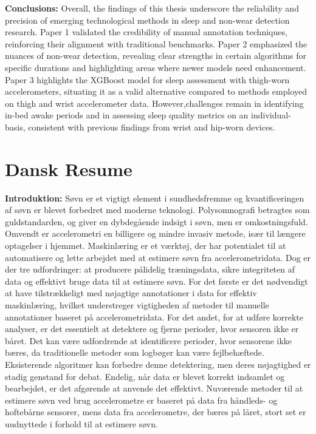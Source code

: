 \documentclass[
  10pt,
]{scrbook}
\let\originaltextbf\textbf
\renewcommand{\textbf}[1]{\textcolor{color1}{\originaltextbf{#1}}}
\begin{document}
\textbf{Conclusions:} Overall, the findings of this thesis underscore
the reliability and precision of emerging technological methods in sleep
and non-wear detection research. Paper 1 validated the credibility of
manual annotation techniques, reinforcing their alignment with
traditional benchmarks. Paper 2 emphasized the nuances of non-wear
detection, revealing clear strengths in certain algorithms for specific
durations and highlighting areas where newer models need enhancement.
Paper 3 highlights the XGBoost model for sleep assessment with
thigh-worn accelerometers, situating it as a valid alternative compared
to methods employed on thigh and wrist accelerometer data.
However,challenges remain in identifying in-bed awake periods and in
assessing sleep quality metrics on an individual-basis, consistent with
previous findings from wrist and hip-worn devices.

\hypertarget{dansk-resume}{%
\chapter{Dansk Resume}\label{dansk-resume}}

\textbf{Introduktion:} Søvn er et vigtigt element i sundhedsfremme og
kvantificeringen af søvn er blevet forbedret med moderne teknologi.
Polysomnografi betragtes som guldstandarden, og giver en dybdegående
indsigt i søvn, men er omkostningsfuld. Omvendt er accelerometri en
billigere og mindre invasiv metode, især til længere optagelser i
hjemmet. Maskinlæring er et værktøj, der har potentialet til at
automatisere og lette arbejdet med at estimere søvn fra
accelerometridata. Dog er der tre udfordringer: at producere pålidelig
træningsdata, sikre integriteten af data og effektivt bruge data til at
estimere søvn. For det første er det nødvendigt at have tilstrækkeligt
med nøjagtige annotationer i data for effektiv maskinlæring, hvilket
understreger vigtigheden af metoder til manuelle annotationer baseret på
accelerometridata. For det andet, for at udføre korrekte analyser, er
det essentielt at detektere og fjerne perioder, hvor sensoren ikke er
båret. Det kan være udfordrende at identificere perioder, hvor sensorene
ikke bæres, da traditionelle metoder som logbøger kan være
fejlbehæftede. Eksisterende algoritmer kan forbedre denne detektering,
men deres nøjagtighed er stadig genstand for debat. Endelig, når data er
blevet korrekt indsamlet og bearbejdet, er det afgørende at anvende det
effektivt. Nuværende metoder til at estimere søvn ved brug accelerometre
er baseret på data fra håndleds- og hoftebårne sensorer, mens data fra
accelerometre, der bæres på låret, stort set er uudnyttede i forhold til
at estimere søvn.
\end{document}
